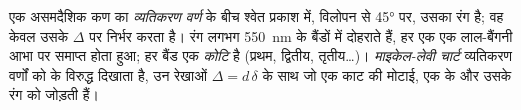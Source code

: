 \begin{definition}[व्यतिकरण वर्ण, कोटि, माइकेल-लेवी चार्ट]\label{def:b1:optical-mineralogy:interference-colour}
एक असमदैशिक कण का \emph{व्यतिकरण वर्ण}  के बीच श्वेत प्रकाश में, विलोपन से \ang{45} पर,
उसका रंग है; वह केवल उसके  $\Delta$ पर निर्भर करता है। रंग लगभग \qty{550}{nm}  के बैंडों में दोहराते हैं, हर एक
एक लाल-बैंगनी आभा पर समाप्त होता हुआ; हर बैंड एक \emph{कोटि} है (प्रथम, द्वितीय, तृतीय\dots)।
\emph{माइकेल-लेवी चार्ट} व्यतिकरण वर्णों को  के विरुद्ध दिखाता है, उन रेखाओं $\Delta = d\,\delta$
के साथ जो एक काट की मोटाई, एक  के  और उसके रंग को जोड़ती हैं।
\end{definition}

